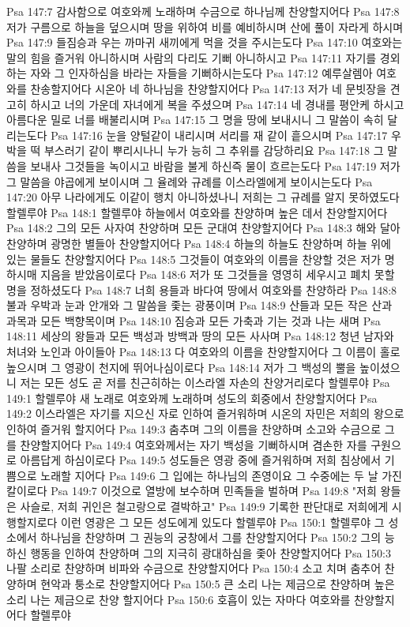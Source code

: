 Psa 147:7  감사함으로 여호와께 노래하며 수금으로 하나님께 찬양할지어다
Psa 147:8  저가 구름으로 하늘을 덮으시며 땅을 위하여 비를 예비하시며 산에 풀이 자라게 하시며
Psa 147:9  들짐승과 우는 까마귀 새끼에게 먹을 것을 주시는도다
Psa 147:10  여호와는 말의 힘을 즐거워 아니하시며 사람의 다리도 기뻐 아니하시고
Psa 147:11  자기를 경외하는 자와 그 인자하심을 바라는 자들을 기뻐하시는도다
Psa 147:12  예루살렘아 여호와를 찬송할지어다 시온아 네 하나님을 찬양할지어다
Psa 147:13  저가 네 문빗장을 견고히 하시고 너의 가운데 자녀에게 복을 주셨으며
Psa 147:14  네 경내를 평안케 하시고 아름다운 밀로 너를 배불리시며
Psa 147:15  그 명을 땅에 보내시니 그 말씀이 속히 달리는도다
Psa 147:16  눈을 양털같이 내리시며 서리를 재 같이 흩으시며
Psa 147:17  우박을 떡 부스러기 같이 뿌리시나니 누가 능히 그 추위를 감당하리요
Psa 147:18  그 말씀을 보내사 그것들을 녹이시고 바람을 불게 하신즉 물이 흐르는도다
Psa 147:19  저가 그 말씀을 야곱에게 보이시며 그 율례와 규례를 이스라엘에게 보이시는도다
Psa 147:20  아무 나라에게도 이같이 행치 아니하셨나니 저희는 그 규례를 알지 못하였도다 할렐루야
Psa 148:1  할렐루야 하늘에서 여호와를 찬양하며 높은 데서 찬양할지어다
Psa 148:2  그의 모든 사자여 찬양하며 모든 군대여 찬양할지어다
Psa 148:3  해와 달아 찬양하며 광명한 별들아 찬양할지어다
Psa 148:4  하늘의 하늘도 찬양하며 하늘 위에 있는 물들도 찬양할지어다
Psa 148:5  그것들이 여호와의 이름을 찬양할 것은 저가 명하시매 지음을 받았음이로다
Psa 148:6  저가 또 그것들을 영영히 세우시고 폐치 못할 명을 정하셨도다
Psa 148:7  너희 용들과 바다여 땅에서 여호와를 찬양하라
Psa 148:8  불과 우박과 눈과 안개와 그 말씀을 좇는 광풍이며
Psa 148:9  산들과 모든 작은 산과 과목과 모든 백향목이며
Psa 148:10  짐승과 모든 가축과 기는 것과 나는 새며
Psa 148:11  세상의 왕들과 모든 백성과 방백과 땅의 모든 사사며
Psa 148:12  청년 남자와 처녀와 노인과 아이들아
Psa 148:13  다 여호와의 이름을 찬양할지어다 그 이름이 홀로 높으시며 그 영광이 천지에 뛰어나심이로다
Psa 148:14  저가 그 백성의 뿔을 높이셨으니 저는 모든 성도 곧 저를 친근히하는 이스라엘 자손의 찬양거리로다 할렐루야
Psa 149:1  할렐루야 새 노래로 여호와께 노래하며 성도의 회중에서 찬양할지어다
Psa 149:2  이스라엘은 자기를 지으신 자로 인하여 즐거워하며 시온의 자민은 저희의 왕으로 인하여 즐거워 할지어다
Psa 149:3  춤추며 그의 이름을 찬양하며 소고와 수금으로 그를 찬양할지어다
Psa 149:4  여호와께서는 자기 백성을 기뻐하시며 겸손한 자를 구원으로 아름답게 하심이로다
Psa 149:5  성도들은 영광 중에 즐거워하며 저희 침상에서 기쁨으로 노래할 지어다
Psa 149:6  그 입에는 하나님의 존영이요 그 수중에는 두 날 가진 칼이로다
Psa 149:7  이것으로 열방에 보수하며 민족들을 벌하며
Psa 149:8  "저희 왕들은 사슬로, 저희 귀인은 철고랑으로 결박하고"
Psa 149:9  기록한 판단대로 저희에게 시행할지로다 이런 영광은 그 모든 성도에게 있도다 할렐루야
Psa 150:1  할렐루야 그 성소에서 하나님을 찬양하며 그 권능의 궁창에서 그를 찬양할지어다
Psa 150:2  그의 능하신 행동을 인하여 찬양하며 그의 지극히 광대하심을 좇아 찬양할지어다
Psa 150:3  나팔 소리로 찬양하며 비파와 수금으로 찬양할지어다
Psa 150:4  소고 치며 춤추어 찬양하며 현악과 퉁소로 찬양할지어다
Psa 150:5  큰 소리 나는 제금으로 찬양하며 높은 소리 나는 제금으로 찬양 할지어다
Psa 150:6  호흡이 있는 자마다 여호와를 찬양할지어다 할렐루야


